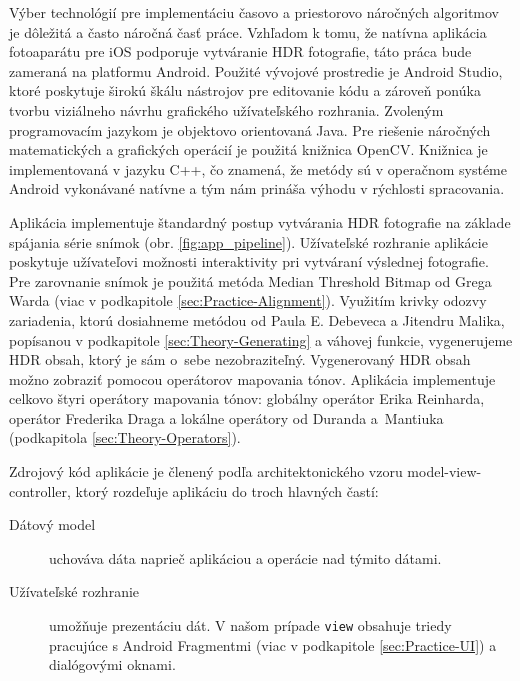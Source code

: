 Výber technológií pre implementáciu časovo a priestorovo náročných algoritmov je dôležitá a často 
náročná časť práce. Vzhľadom k tomu, že natívna aplikácia fotoaparátu pre iOS podporuje vytváranie
HDR fotografie, táto práca bude zameraná na platformu Android. Použité vývojové prostredie je
Android Studio, ktoré poskytuje širokú škálu nástrojov pre editovanie kódu a zároveň ponúka tvorbu 
viziálneho návrhu grafického užívateľského rozhrania. Zvoleným programovacím jazykom je objektovo 
orientovaná Java. Pre riešenie náročných matematických a grafických operácií je použitá knižnica
OpenCV. Knižnica je implementovaná v jazyku C++, čo znamená, že metódy sú v operačnom systéme Android
vykonávané natívne a tým nám prináša výhodu v rýchlosti spracovania.

Aplikácia implementuje štandardný postup vytvárania HDR fotografie na základe spájania série snímok
(obr. \ref{fig:app_pipeline}). Užívateľské rozhranie aplikácie poskytuje užívateľovi možnosti
interaktivity pri vytváraní výslednej fotografie. Pre zarovnanie snímok je použitá metóda Median
Threshold Bitmap od Grega Warda (viac v podkapitole \ref{sec:Practice-Alignment}). 
Využitím krivky odozvy zariadenia, ktorú dosiahneme metódou od Paula E. Debeveca a Jitendru Malika,
popísanou v podkapitole \ref{sec:Theory-Generating} a váhovej funkcie, vygenerujeme HDR obsah,
ktorý je sám o~sebe nezobraziteľný. Vygenerovaný HDR obsah možno zobraziť pomocou operátorov mapovania
tónov. Aplikácia implementuje celkovo štyri operátory mapovania tónov: globálny operátor Erika Reinharda,
operátor Frederika Draga a lokálne operátory od Duranda a~Mantiuka (podkapitola \ref{sec:Theory-Operators}).

Zdrojový kód aplikácie je členený podľa architektonického vzoru model-view-controller, ktorý rozdeľuje
aplikáciu do troch hlavných častí:
\begin{description}
  \item [Dátový model] uchováva dáta naprieč aplikáciou a operácie nad týmito dátami.
\end{description}
\setlength{\DTbaselineskip}{2em}

\begin{description}
  \item [Užívateľské rozhranie] umožňuje prezentáciu dát. V našom prípade \texttt{view} obsahuje
  triedy pracujúce s Android Fragmentmi (viac v podkapitole \ref{sec:Practice-UI}) a dialógovými oknami.
\end{description}
\setlength{\DTbaselineskip}{2em}

